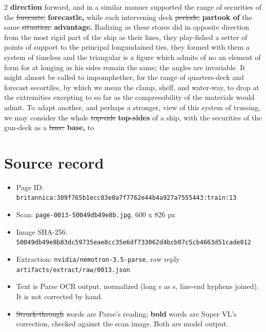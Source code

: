 \documentclass[10pt]{article}
\begin{document}
\begin{multicols}{2}
\textbf{direction} forward, and in a similar manner supported the range of securities of the \sout{forecasts,} \textbf{forecastle,} while each intervening deck \sout{periods,} \textbf{partook of} the same \sout{situation.} \textbf{advantage.} Radizing as these stores did in opposite direction from the most rigid part of the ship as their lines, they play-fished a setter of points of support to the principal longundained ties, they formed with them a system of timeless and the triangular is a figure which admits of no an element of form for at longing as his sides remain the same; the angles are invariable. It might almost be called to impomphether, for the range of quarters-deck and forecast secortiles, by which we mean the clamp, shelf, and water-way, to drop at the extremities excepting to so far as the compressibility of the materials would admit. To adapt another, and perhaps a stronger, view of this system of trussing, we may consider the whole \sout{top-side} \textbf{top-sides} of a ship, with the securities of the gun-deck as a \sout{base:} \textbf{base,} to
\end{multicols}
\section*{Source record}
\begin{itemize}
\item Page ID: \texttt{britannica:309f765b1ecc83e0a7f7762e44b4a927a7555443:train:13}
\item Scan: \texttt{page-0013-50049db49e8b.jpg}, 600 x 826 px
\item Image SHA-256: \texttt{\small 50049db49e8b83dc59735eae8cc35e6df733062d4bcb07c5cb4663d51cade012}
\item Extraction: \texttt{nvidia/nemotron-3.5-parse}, raw reply \texttt{artifacts/extract/raw/0013.json}
\item Text is Parse OCR output, normalized (long s as s, line-end hyphens joined). It is not corrected by hand.
\item \sout{Struck-through} words are Parse's reading; \textbf{bold} words are Super VL's correction, checked against the scan image. Both are model output.
\end{itemize}
\end{document}

